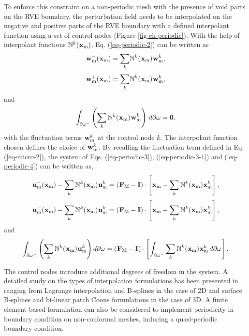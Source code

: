 To enforce this constraint on a non-periodic mesh with the presence of void parts on the RVE boundary, the perturbation field needs to be interpolated on the negative and positive parts of the RVE boundary with a defined interpolant function using a set of control nodes (Figure \ref{fig-ch-periodic}). With the help of interpolant functions $ \mathbb{N}^k(\tgmm[]{x}) $, Eq. (\ref{eq-periodic-2}) 
can be written as
\begin{equation}\label{eq-periodic-3}
\tgmm[]{w}^-(\tgmm[]{x})  = \underset{k}{\sum}\mathbb{N}^k(\tgmm[]{x})\tgmm[]{w}^k,
\end{equation}
\begin{equation}\label{eq-periodic-3-1}
\tgmm[]{w}^+(\tgmm[]{x})  = \underset{k}{\sum}\mathbb{N}^k(\tgmm[]{x})\tgmm[]{w}^k,
\end{equation}
and
\begin{equation}\label{eq-periodic-4}
\int_{\partial\omega^-}\left(\sum_k\mathbb{N}^k(\tgmm{x})\tgmm{w}^k\right)\,d\partial\omega=\bm{0}.
\end{equation}
with the fluctuation terms $ \tgmm{w}^k $ at the control node $ k $.
The interpolant function chosen defines the choice of $ \tgmm[]{w}^k $. By recalling the fluctuation term defined in Eq. (\ref{eq-micro-2}), the system of Eqs. (\ref{eq-periodic-3}), (\ref{eq-periodic-3-1}) and (\ref{eq-periodic-4}) can be written as,
\begin{equation}\label{eq-periodic-5}
\tgmm{u}^-(\tgmm{x})-\sum_k\mathbb{N}^k(\tgmm{x})\tgmm{u}^k=\left(\tgm{F}-\textbf{I}\right)\cdot\left[\tgmm{x}-\sum_k\mathbb{N}^k(\tgmm{x})\tgmm{x}^k\right],
\end{equation}
\begin{equation}\label{eq-periodic-5-1}
\tgmm{u}^+(\tgmm{x})-\sum_k\mathbb{N}^k(\tgmm{x})\tgmm{u}^k=\left(\tgm{F}-\textbf{I}\right)\cdot\left[\tgmm{x}-\sum_k\mathbb{N}^k(\tgmm{x})\tgmm{x}^k\right],
\end{equation}
and
\begin{equation}\label{eq-periodic-5-2}
\int_{\partial\omega^-}\left(\sum_k\mathbb{N}^k(\tgmm{x})\tgmm{u}^k\right)d\partial\omega=\left(\tgm{F}-\textbf{I}\right)\cdot\left[\int_{\partial\omega^-}\sum_k\mathbb{N}^k(\tgmm{x})\tgmm{x}^k\,d\partial\omega\right].
\end{equation}

The control nodes introduce additional degrees of freedom in the system. A detailed study on the types of interpolation formulations has been presented in \cite{nguyenImposingPeriodicBoundary2012} ranging from Lagrange interpolation and B-splines in the case of 2D and surface B-splines and bi-linear patch Coons formulations in the case of 3D. A finite element based formulation can also be considered to implement periodicity in boundary condition on non-conformal meshes, inducing a quasi-periodic boundary condition\cite{wismansComputedTomographybasedModeling2009}.

